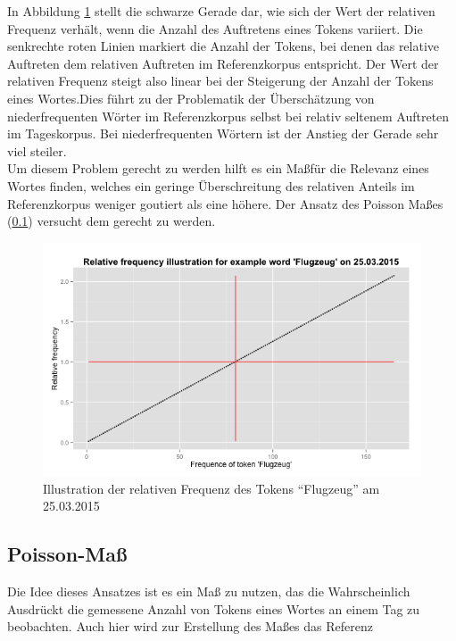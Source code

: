 In Abbildung \ref{pic.rel_freq} stellt die schwarze Gerade dar, wie sich der Wert der relativen Frequenz verh\"alt, wenn die Anzahl des Auftretens eines Tokens variiert. Die senkrechte roten Linien markiert die Anzahl der Tokens, bei denen das relative Auftreten dem relativen Auftreten im Referenzkorpus entspricht. Der Wert der relativen Frequenz steigt also linear bei der Steigerung der Anzahl der Tokens eines Wortes.Dies f\"uhrt zu der Problematik der \"Ubersch\"atzung von niederfrequenten W\"orter im Referenzkorpus selbst bei relativ seltenem Auftreten im Tageskorpus. Bei niederfrequenten W\"ortern ist der Anstieg der Gerade sehr viel steiler.\\
Um diesem Problem gerecht zu werden hilft es ein Ma\ss f\"ur die Relevanz eines Wortes finden, welches ein geringe \"Uberschreitung des relativen Anteils im Referenzkorpus weniger goutiert als eine h\"ohere. Der Ansatz des Poisson Ma\ss es (\ref{subsec.poisson}) versucht dem gerecht zu werden.\\
\begin{figure}[h!]
    \centering
    \includegraphics[width=1\textwidth]{pictures/relfreqFlugzeug.png}
    \caption{Illustration der relativen Frequenz des Tokens \enquote{Flugzeug} am 25.03.2015}\label{pic.rel_freq}
\end{figure}



\subsection{Poisson-Maß}\label{subsec.poisson}
Die Idee dieses Ansatzes ist es ein Maß zu nutzen, das die Wahrscheinlich Ausdrückt die gemessene Anzahl von Tokens eines Wortes an einem Tag zu beobachten. Auch hier wird zur Erstellung des Maßes  das Referenz

